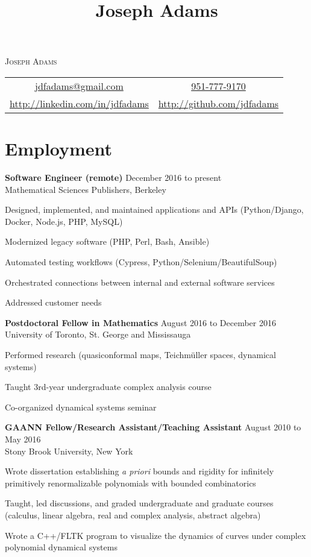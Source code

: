 \documentclass[11pt]{article}
\title{Joseph Adams}
\makeatletter
\newcommand\email{jdfadams@gmail.com}
\newcommand\phone{951-777-9170}
\makeatother
\begin{document}

\begin{center}
\textsc{\Large Joseph Adams} \\[1.5\baselineskip]
\begin{tabular}{c c}
\href{mailto:\email}{\email} & \href{tel:1-\phone}{\phone} \\
\url{http://linkedin.com/in/jdfadams} & \url{http://github.com/jdfadams}
\end{tabular}
\end{center}

\section*{Employment}
\noindent\textbf{Software Engineer (remote)} \hfill December 2016 to present\\
Mathematical Sciences Publishers, Berkeley\\
\begin{inparaitem}
\item Designed, implemented, and maintained applications and APIs (Python/Django, Docker, Node.js, PHP, MySQL)
\item Modernized legacy software (PHP, Perl, Bash, Ansible)
\item Automated testing workflows (Cypress, Python/Selenium/BeautifulSoup)
\item Orchestrated connections between internal and external software services
\item Addressed customer needs
\end{inparaitem}

\noindent\textbf{Postdoctoral Fellow in Mathematics} \hfill August 2016 to December 2016\\
University of Toronto, St. George and Mississauga\\
\begin{inparaitem}
\item Performed research (quasiconformal maps, Teichm\"{u}ller spaces, dynamical systems)
\item Taught 3rd-year undergraduate complex analysis course
\item Co-organized dynamical systems seminar
\end{inparaitem}

\noindent\textbf{GAANN Fellow/Research Assistant/Teaching Assistant} \hfill August 2010 to May 2016\\
Stony Brook University, New York
\begin{inparaitem}
\item Wrote dissertation establishing \textit{a priori} bounds and rigidity for infinitely primitively renormalizable polynomials with bounded combinatorics
\item Taught, led discussions, and graded undergraduate and graduate courses (calculus, linear algebra, real and complex analysis, abstract algebra)
\item Wrote a C++/FLTK program to visualize the dynamics of curves under complex polynomial dynamical systems
\end{inparaitem}
\end{document}
